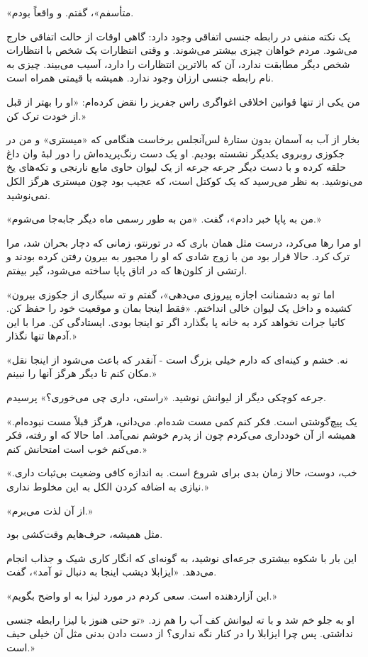 
«متأسفم»، گفتم. و واقعاً بودم.

یک نکته منفی در رابطه جنسی اتفاقی وجود دارد: گاهی اوقات از حالت اتفاقی خارج می‌شود. مردم خواهان چیزی بیشتر می‌شوند. و وقتی انتظارات یک شخص با انتظارات شخص دیگر مطابقت ندارد، آن که بالاترین انتظارات را دارد، آسیب می‌بیند. چیزی به نام رابطه جنسی ارزان وجود ندارد. همیشه با قیمتی همراه است.

من یکی از تنها قوانین اخلاقی اغواگری راس جفریز را نقض کرده‌ام: «او را بهتر از قبل از خودت ترک کن.»

بخار از آب به آسمان بدون ستارهٔ لس‌آنجلس برخاست هنگامی که «میستری» و من در جکوزی روبروی یکدیگر نشسته بودیم. او یک دست رنگ‌پریده‌اش را دور لبهٔ وان داغ حلقه کرده و با دست دیگر جرعه جرعه از یک لیوان حاوی مایع نارنجی و تکه‌های یخ می‌نوشید. به نظر می‌رسید که یک کوکتل است، که عجیب بود چون میستری هرگز الکل نمی‌نوشید.

«من به پاپا خبر دادم»، گفت. «من به طور رسمی ماه دیگر جابه‌جا می‌شوم.»

او مرا رها می‌کرد، درست مثل همان باری که در تورنتو، زمانی که دچار بحران شد، مرا ترک کرد. حالا قرار بود من با زوج شادی که او را مجبور به بیرون رفتن کرده بودند و ارتشی از کلون‌ها که در اتاق پاپا ساخته می‌شود، گیر بیفتم.

«اما تو به دشمنانت اجازه پیروزی می‌دهی»، گفتم و ته سیگاری از جکوزی بیرون کشیده و داخل یک لیوان خالی انداختم. «فقط اینجا بمان و موقعیت خود را حفظ کن. کاتیا جرات نخواهد کرد به خانه پا بگذارد اگر تو اینجا بودی. ایستادگی کن. مرا با این آدم‌ها تنها نگذار.»

«نه. خشم و کینه‌ای که دارم خیلی بزرگ است - آنقدر که باعث می‌شود از اینجا نقل مکان کنم تا دیگر هرگز آنها را نبینم.»

جرعه کوچکی دیگر از لیوانش نوشید. «راستی، داری چی می‌خوری؟» پرسیدم.

«یک پیچ‌گوشتی است. فکر کنم کمی مست شده‌ام. می‌دانی، هرگز قبلاً مست نبوده‌ام. همیشه از آن خودداری می‌کردم چون از پدرم خوشم نمی‌آمد. اما حالا که او رفته، فکر می‌کنم خوب است امتحانش کنم.»

«خب، دوست، حالا زمان بدی برای شروع است. به اندازه کافی وضعیت بی‌ثبات داری. نیازی به اضافه کردن الکل به این مخلوط نداری.»

«از آن لذت می‌برم.»

مثل همیشه، حرف‌هایم وقت‌کشی بود.

این بار با شکوه بیشتری جرعه‌ای نوشید، به گونه‌ای که انگار کاری شیک و جذاب انجام می‌دهد. «ایزابلا دیشب اینجا به دنبال تو آمد»، گفت.

«این آزاردهنده است. سعی کردم در مورد لیزا به او واضح بگویم.»

او به جلو خم شد و با ته لیوانش کف آب را هم زد. «تو حتی هنوز با لیزا رابطه‌ جنسی نداشتی. پس چرا ایزابلا را در کنار نگه نداری؟ از دست دادن بدنی مثل آن خیلی حیف است.»